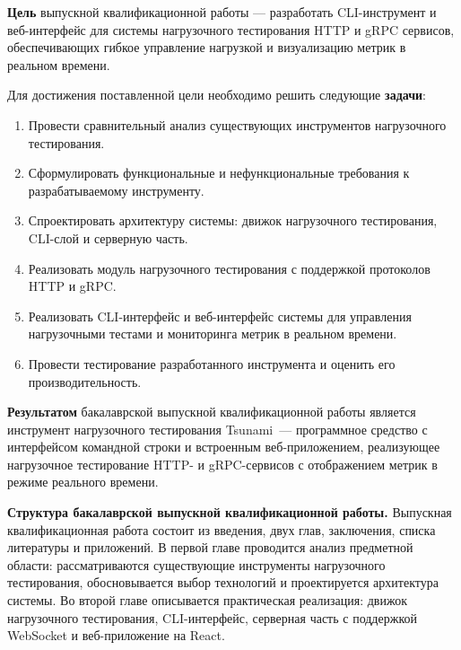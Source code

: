 \textbf{Цель} выпускной квалификационной работы --- разработать CLI-инструмент
и веб-интерфейс для системы нагрузочного тестирования HTTP и gRPC сервисов,
обеспечивающих гибкое управление нагрузкой и визуализацию метрик в реальном времени.

Для достижения поставленной цели необходимо решить следующие \textbf{задачи}:
\begin{enumerate}
  \item Провести сравнительный анализ существующих инструментов нагрузочного тестирования.
  \item Сформулировать функциональные и нефункциональные требования к разрабатываемому инструменту.
  \item Спроектировать архитектуру системы: движок нагрузочного тестирования, CLI-слой и серверную часть.
  \item Реализовать модуль нагрузочного тестирования с поддержкой протоколов HTTP и gRPC.
  \item Реализовать CLI-интерфейс и веб-интерфейс системы для управления нагрузочными тестами и мониторинга метрик в реальном времени.
  \item Провести тестирование разработанного инструмента и оценить его производительность.
\end{enumerate}

\textbf{Результатом} бакалаврской выпускной квалификационной работы является
инструмент нагрузочного тестирования Tsunami~--- программное средство
с интерфейсом командной строки и встроенным веб-приложением,
реализующее нагрузочное тестирование HTTP- и gRPC-сервисов
с отображением метрик в режиме реального времени.

\textbf{Структура бакалаврской выпускной квалификационной работы.}
Выпускная квалификационная работа состоит из введения, двух глав, заключения,
списка литературы и приложений.
В первой главе проводится анализ предметной области:
рассматриваются существующие инструменты нагрузочного тестирования,
обосновывается выбор технологий и проектируется архитектура системы.
Во второй главе описывается практическая реализация:
движок нагрузочного тестирования, CLI-интерфейс, серверная часть
с поддержкой WebSocket и веб-приложение на React.
